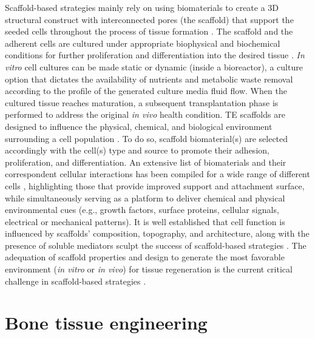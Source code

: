 Scaffold-based strategies mainly rely on using biomaterials to create a \ac{3D} structural construct with interconnected pores (the scaffold) that support the seeded cells throughout the process of tissue formation \cite{Dissanayaka2020-ig}. The scaffold and the adherent cells are cultured under appropriate biophysical and biochemical conditions for further proliferation and differentiation into the desired tissue \cite{Howard2008-qk}. \textit{In vitro} cell cultures can be made static or dynamic (inside a bioreactor), a culture option that dictates the availability of nutrients and metabolic waste removal according to the profile of the generated culture media fluid flow. When the cultured tissue reaches maturation, a subsequent transplantation phase is performed to address the original \textit{in vivo} health condition. \ac{TE} scaffolds are designed to influence the physical, chemical, and biological environment surrounding a cell population \cite{Reina-Romo2019-ry}. To do so,
scaffold biomaterial(s) are selected accordingly with the cell(s) type and source to promote their adhesion, proliferation, and differentiation. An extensive list of biomaterials and their correspondent cellular interactions has been compiled for a wide range of different cells \cite{Qu2019-qq}, highlighting those that provide improved support and attachment surface, while simultaneously serving as a platform to deliver chemical and physical environmental cues (e.g., growth factors, surface proteins, cellular signals, electrical or mechanical patterns). It is well established that cell function is influenced by scaffolds' composition, topography, and architecture, along with the presence of soluble mediators sculpt the success of scaffold-based strategies \cite{Ripamonti2004-vm}. The adequation of scaffold properties and design to generate the most favorable environment (\textit{in vitro} or \textit{in vivo})  for tissue regeneration is the current critical challenge in scaffold-based strategies \cite{Hutmacher2023-le}.   


\section{Bone tissue engineering}

